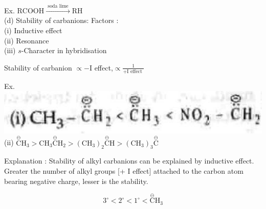 \documentclass[10pt]{article}
\begin{document}
Ex. $\mathrm{RCOOH} \xrightarrow{\text { soda lime }} \mathrm{RH}$\\
(d) Stability of carbanions: Factors :\\
(i) Inductive effect\\
(ii) Resonance\\
(iii) $s$-Character in hybridisation

Stability of carbanion $\propto-\mathrm{I}$ effect,$\propto \frac{1}{+\mathrm{I} \text { effect }}$

Ex.\\
\includegraphics[max width=\textwidth, center]{2025_01_28_8470952b98110cec3aabg-087(1)}\\
(ii) $\stackrel{\ominus}{\mathrm{C}} \mathrm{H}_{3}>\mathrm{CH}_{3} \stackrel{\ominus}{\mathrm{C}} \mathrm{H}_{2}>\left(\mathrm{CH}_{3}\right)_{2} \stackrel{\ominus}{\mathrm{C}} \mathrm{H}>\left(\mathrm{CH}_{3}\right)_{3} \stackrel{\ominus}{\mathrm{C}}$

Explanation : Stability of alkyl carbanions can be explained by inductive effect. Greater the number of alkyl groups [+ I effect] attached to the carbon atom bearing negative charge, lesser is the stability.

$$
3^{\circ}<2^{\circ}<1^{\circ}<\stackrel{\ominus}{\mathrm{C}} \mathrm{H}_{3}
$$
\end{document}
